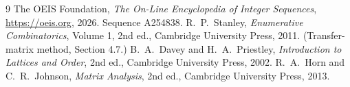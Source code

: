 \documentclass[11pt,a4paper]{article}
\theoremstyle{plain}
\theoremstyle{definition}
\begin{document}
\begin{thebibliography}{9}
 The OEIS Foundation, \emph{The On-Line Encyclopedia of Integer
Sequences}, \url{https://oeis.org}, 2026. Sequence A254838.
 R.~P.~Stanley, \emph{Enumerative Combinatorics}, Volume 1, 2nd ed.,
Cambridge University Press, 2011. (Transfer-matrix method, Section 4.7.)
 B.~A.~Davey and H.~A.~Priestley, \emph{Introduction to Lattices and
Order}, 2nd ed., Cambridge University Press, 2002.
 R.~A.~Horn and C.~R.~Johnson, \emph{Matrix Analysis}, 2nd ed., Cambridge
University Press, 2013.
\end{thebibliography}
\end{document}
